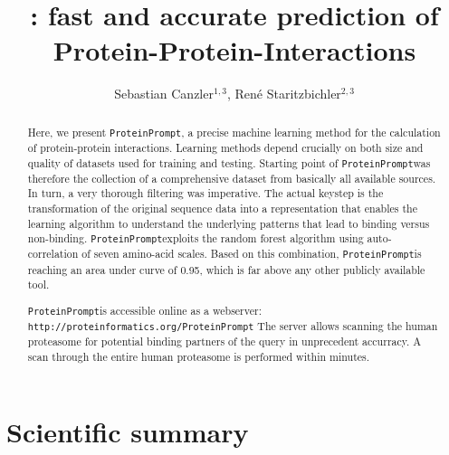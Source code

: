 \documentclass{article}
\title{\tool: fast and accurate prediction of Protein-Protein-Interactions}
\author{ Sebastian Canzler$^{1,3}$, Ren\'{e} Staritzbichler$^{2,3}$}
\newcommand{\url}[1]{\texttt{http://\small #1}}
\newcommand{\toolblank}{\texttt{ProteinPrompt}}
\newcommand{\tool}{\toolblank\hspace{2pt}}
\newcommand{\website}{\url{proteinformatics.org/\tool}}
\begin{document}
\maketitle

%  
%  






 

\begin{abstract}

  Here, we present \tool, a precise machine learning method for the calculation of protein-protein interactions.
  Learning methods depend crucially on both size and quality of datasets used for training and testing.
  Starting point of \tool was therefore the collection of a comprehensive dataset from basically all available sources.
  In turn, a very thorough filtering was imperative.
  The actual keystep is the transformation of the original sequence data into a representation that enables the learning algorithm to understand the underlying patterns that lead to binding versus non-binding.
   \tool exploits the random forest algorithm using auto-correlation of seven amino-acid scales.
   Based on this combination, \tool is reaching an area under curve of 0.95, which is far above any other publicly available tool. 
  
  \tool  is accessible online as a webserver:
  \website
  The server allows  scanning the human proteasome for potential binding partners of the query in unprecedent accurracy.
  A scan through the entire human proteasome is performed within minutes.  
  

\end{abstract}


\section*{Scientific summary}
\end{document}
